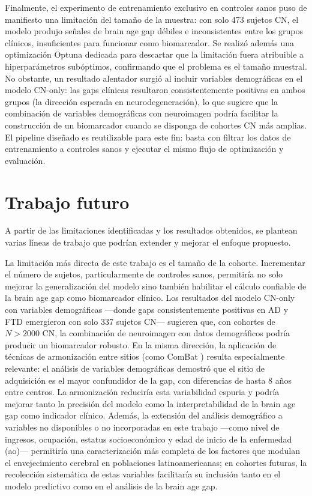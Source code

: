 Finalmente, el experimento de entrenamiento exclusivo en controles sanos puso de manifiesto una limitación del tamaño de la muestra: con solo 473 sujetos CN, el modelo produjo señales de brain age gap débiles e inconsistentes entre los grupos clínicos, insuficientes para funcionar como biomarcador. Se realizó además una optimización Optuna dedicada para descartar que la limitación fuera atribuible a hiperparámetros subóptimos, confirmando que el problema es el tamaño muestral. No obstante, un resultado alentador surgió al incluir variables demográficas en el modelo CN-only: las gaps clínicas resultaron consistentemente positivas en ambos grupos (la dirección esperada en neurodegeneración), lo que sugiere que la combinación de variables demográficas con neuroimagen podría facilitar la construcción de un biomarcador cuando se disponga de cohortes CN más amplias. El pipeline diseñado es reutilizable para este fin: basta con filtrar los datos de entrenamiento a controles sanos y ejecutar el mismo flujo de optimización y evaluación.

\section{Trabajo futuro}

A partir de las limitaciones identificadas y los resultados obtenidos, se plantean varias líneas de trabajo que podrían extender y mejorar el enfoque propuesto.

La limitación más directa de este trabajo es el tamaño de la cohorte. Incrementar el número de sujetos, particularmente de controles sanos, permitiría no solo mejorar la generalización del modelo sino también habilitar el cálculo confiable de la brain age gap como biomarcador clínico. Los resultados del modelo CN-only con variables demográficas ---donde gaps consistentemente positivas en AD y FTD emergieron con solo 337 sujetos CN--- sugieren que, con cohortes de $N > 2000$ CN, la combinación de neuroimagen con datos demográficos podría producir un biomarcador robusto. En la misma dirección, la aplicación de técnicas de armonización entre sitios (como ComBat \cite{fortin2017harmonization}) resulta especialmente relevante: el análisis de variables demográficas demostró que el sitio de adquisición es el mayor confundidor de la gap, con diferencias de hasta 8 años entre centros. La armonización reduciría esta variabilidad espuria y podría mejorar tanto la precisión del modelo como la interpretabilidad de la brain age gap como indicador clínico. Además, la extensión del análisis demográfico a variables no disponibles o no incorporadas en este trabajo ---como nivel de ingresos, ocupación, estatus socioeconómico y edad de inicio de la enfermedad (ao)--- permitiría una caracterización más completa de los factores que modulan el envejecimiento cerebral en poblaciones latinoamericanas; en cohortes futuras, la recolección sistemática de estas variables facilitaría su inclusión tanto en el modelo predictivo como en el análisis de la brain age gap.


